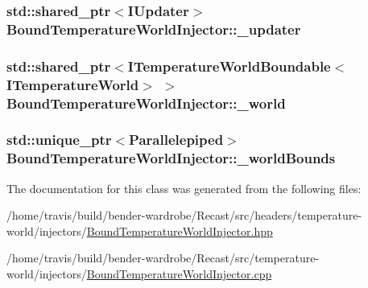 \hypertarget{class_bound_temperature_world_injector_a1e6c06b5c8ecafe011f27fa69072751e}{
\subsubsection[{\-\_\-updater}]{\setlength{\rightskip}{0pt plus 5cm}std\-::shared\-\_\-ptr$<${\bf I\-Updater}$>$ Bound\-Temperature\-World\-Injector\-::\-\_\-updater\hspace{0.3cm}{\ttfamily [protected]}}}\label{class_bound_temperature_world_injector_a1e6c06b5c8ecafe011f27fa69072751e}
\hypertarget{class_bound_temperature_world_injector_a5917901f6697587dd6dd05b3f1fd0549}{
\subsubsection[{\-\_\-world}]{\setlength{\rightskip}{0pt plus 5cm}std\-::shared\-\_\-ptr$<${\bf I\-Temperature\-World\-Boundable}$<${\bf I\-Temperature\-World}$>$ $>$ Bound\-Temperature\-World\-Injector\-::\-\_\-world\hspace{0.3cm}{\ttfamily [protected]}}}\label{class_bound_temperature_world_injector_a5917901f6697587dd6dd05b3f1fd0549}
\hypertarget{class_bound_temperature_world_injector_a99e1aa88a9e38bddb58c22b030a126c3}{
\subsubsection[{\-\_\-world\-Bounds}]{\setlength{\rightskip}{0pt plus 5cm}std\-::unique\-\_\-ptr$<${\bf Parallelepiped}$>$ Bound\-Temperature\-World\-Injector\-::\-\_\-world\-Bounds\hspace{0.3cm}{\ttfamily [protected]}}}\label{class_bound_temperature_world_injector_a99e1aa88a9e38bddb58c22b030a126c3}


The documentation for this class was generated from the following files\-:\begin{DoxyCompactItemize}
\item 
/home/travis/build/bender-\/wardrobe/\-Recast/src/headers/temperature-\/world/injectors/\hyperlink{_bound_temperature_world_injector_8hpp}{Bound\-Temperature\-World\-Injector.\-hpp}\item 
/home/travis/build/bender-\/wardrobe/\-Recast/src/temperature-\/world/injectors/\hyperlink{_bound_temperature_world_injector_8cpp}{Bound\-Temperature\-World\-Injector.\-cpp}\end{DoxyCompactItemize}

